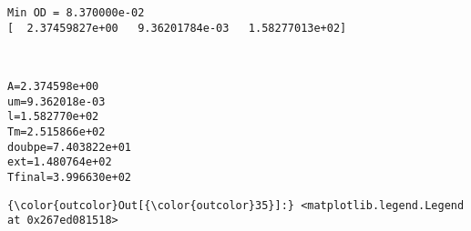 \documentclass[11pt]{article}
\begin{document}
    \begin{Verbatim}[commandchars=\\\{\}]
Min OD = 8.370000e-02
[  2.37459827e+00   9.36201784e-03   1.58277013e+02]

    \end{Verbatim}

    \begin{center}
    \end{center}
    { \hspace*{\fill} \\}
    
    \begin{Verbatim}[commandchars=\\\{\}]
A=2.374598e+00
um=9.362018e-03
l=1.582770e+02
Tm=2.515866e+02
doubpe=7.403822e+01
ext=1.480764e+02
Tfinal=3.996630e+02

    \end{Verbatim}

            \begin{Verbatim}[commandchars=\\\{\}]
{\color{outcolor}Out[{\color{outcolor}35}]:} <matplotlib.legend.Legend at 0x267ed081518>
\end{Verbatim}
        
    \begin{center}
    \end{center}
    { \hspace*{\fill} \\}
    
    \begin{center}
    \end{center}
    { \hspace*{\fill} \\}
    
\end{document}
